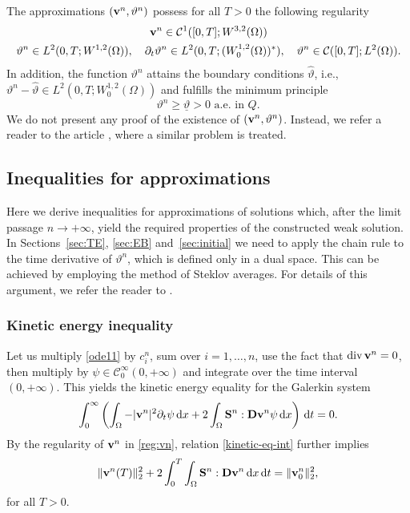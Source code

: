 \documentclass[11pt, a4paper, reqno]{amsart}
\numberwithin{equation}{section}
\newcommand{\diver}{\operatorname{div}}
\newcommand{\dert}{\partial_t}
\newcommand{\thetah}{\hat\thet}
\newcommand{\vc}[1]{{\bf #1}}
\newcommand{\vv}{\vc{v}}
\newcommand{\thet}{\vartheta}
\renewcommand{\S}{\mathbf{S}}
\newcommand{\D}{\mathbf{D}}
\newcommand{\dt}{\,{\rm d} t }
\newcommand{\dx}{\,{\rm d} {x}}
\newcommand{\dxdt}{\dx  \dt}
\newcommand{\intnn}[1]{\int_0^{\infty} #1  \dt}
\newcommand{\intO}[1]{\int_{\Omega} #1 \dx}
\newcommand{\intTO}[1]{\int_0^T \int_{\Omega} #1  \dxdt}
\newcommand{\nm}[1]{\|#1\|}
\begin{document}
The approximations $(\vv^n, \thet^n)$ possess for all $T>0$ the following regularity
\begin{gather}
\label{reg:vn}  \vv^n\in \mathcal{C}^1([0,T];W^{3,2}(\Omega))\\
 \label{eq:approxreg} \thet^n\in L^2(0,T;W^{1,2}(\Omega)),\quad\partial_t\thet^n\in L^2(0,T;(W^{1,2}_0(\Omega))^*),\quad \thet^n\in \mathcal{C}([0,T];L^{2}(\Omega)).
\end{gather}
In addition, the function $\thet^n$ attains the boundary conditions $\thetah$, i.e., $\thet^n - \thetah \in L^2(0,T; W^{1,2}_0(\Omega))$ and fulfills the minimum principle
\begin{equation}\label{eq:minprinn}
\thet^n \ge \underline{\thet}>0 \mbox{ a.e. in }Q.
\end{equation}
We do not present any proof of the existence of $(\vv^n, \thet^n)$. Instead, we refer a reader to the article \cite[Appendix B]{BuFeMa2009}, where a similar problem is treated.

\subsection{Inequalities for approximations}
Here we derive inequalities for approximations of solutions which, after the limit passage $n \to +\infty$, yield the required properties of the constructed weak solution. In Sections~\ref{sec:TE}, \ref{sec:EB} and~\ref{sec:initial} we need to apply the chain rule to the time derivative of $\thet^n$, which is defined only in a dual space. This can be achieved by employing the method of Steklov averages. For details of this argument, we refer the reader to \cite{ABK22,AbBuKa2024}.



\subsubsection{Kinetic energy inequality}
Let us multiply \eqref{ode11} by $c^n_i$, sum over $i=1,\dots,n$, use the fact that $\diver \vv^n=0$, then multiply by $\psi \in \mathcal{C}^{\infty}_0(0,+\infty)$ and integrate over the time interval $(0,+\infty)$. This yields the kinetic energy equality for the Galerkin system
\begin{equation}\label{kinetic-eq-int}
  \intnn{\left(\intO{-|\vv^n|^2 \dert \psi} 
  + 2\intO{\S^n:\D \vv^n \psi}\right)} = 0.
\end{equation}
By the regularity of $\vv^n$ in \eqref{reg:vn}, relation \eqref{kinetic-eq-int} further implies
\begin{equation}\label{kinetic-eq}
  \nm{\vv^n(T)}_2^2 + 2\intTO{\S^n:\D \vv^n} = \nm{\vv^n_0}_2^2,
\end{equation}
for all $T>0$.
\end{document}
